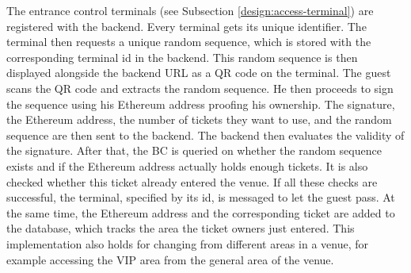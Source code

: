 
The entrance control terminals (see Subsection \ref{design:access-terminal}) are registered with the backend. Every terminal gets its unique identifier. The terminal then requests a unique random sequence, which is stored with the corresponding terminal id in the backend. This random sequence is then displayed alongside the backend URL as a QR code on the terminal. The guest scans the QR code and extracts the random sequence. He then proceeds to sign the sequence using his Ethereum address proofing his ownership. The signature, the Ethereum address, the number of tickets they want to use, and the random sequence are then sent to the backend. The backend then evaluates the validity of the signature. After that, the BC is queried on whether the random sequence exists and if the Ethereum address actually holds enough tickets. It is also checked whether this ticket already entered the venue. If all these checks are successful, the terminal, specified by its id, is messaged to let the guest pass. At the same time, the Ethereum address and the corresponding ticket are added to the database, which tracks the area the ticket owners just entered. This implementation also holds for changing from different areas in a venue, for example accessing the VIP area from the general area of the venue.






